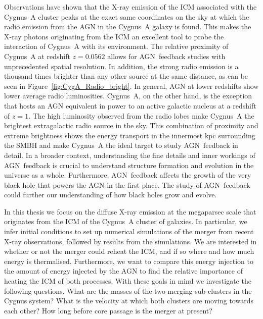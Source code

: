 \documentclass[MScProj_TLRH_ClusterEnergy.tex]{subfiles}
\begin{document}
Observations have shown that the X-ray emission of the ICM associated with the 
Cygnus~A cluster peaks at the exact same coordinates on the sky at which the radio
emission from the AGN in the Cygnus~A galaxy is found. This makes the X-ray photons
originating from the ICM an excellent tool to probe the interaction of Cygnus~A 
with its environment. The relative proximity of Cygnus~A at redshift $z = 0.0562$ 
allows for AGN~feedback studies with unprecedented spatial resolution. In addition,
the strong radio emission is a thousand times brighter than any other source at 
the same distance, as can be seen in Figure~\ref{fig:CygA_Radio_bright}. In general,
AGN at lower redshifts show lower average radio luminosities. Cygnus~A, on the
other hand, is the exception that hosts an AGN equivalent in power to an active 
galactic nucleus at a redshift of $z=1$. The high luminosity observed from the 
radio lobes make Cygnus~A the brightest extragalactic radio source in the sky.
This combination of proximity and extreme brightness shows the energy transport
in the innermost kpc surrounding the SMBH and make Cygnus~A the ideal target to
study AGN~feedback in detail. In a broader context, understanding the fine details
and inner workings of AGN~feedback is crucial to understand structure formation 
and evolution in the universe as a whole. Furthermore, AGN~feedback affects the 
growth of the very black hole that powers the AGN in the first place. The study 
of AGN~feedback could further our understanding of how black holes grow and evolve. 

In this thesis we focus on the diffuse X-ray emission at the megaparsec scale 
that originates from the ICM of the Cygnus~A cluster of galaxies. In particular,
we infer initial conditions to set up numerical simulations of the merger from
recent X-ray observations, followed by results from the simulations.
We are interested in whether or not the merger could reheat the ICM, and if so 
where and how much energy is thermalised. Furthermore, we want to compare this
energy injection to the amount of energy injected by the AGN to find the relative
importance of heating the ICM of both processes. With these goals in mind we 
investigate the following questions. What are the masses of the two merging sub 
clusters in the Cygnus system? What is the velocity at which both clusters are
moving towards each other? How long before core passage is the merger at present?
\end{document}
